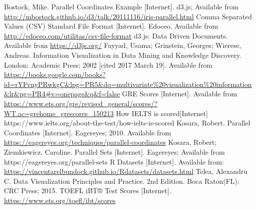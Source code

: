 \documentclass[]{article}
\begin{document}
\begin{thebibliography}{11}
		Bostock, Mike. Parallel Coordinates Example [Internet]. d3.js; Available from \url{http://mbostock.github.io/d3/talk/20111116/iris-parallel.html}
		Comma Separated Values (CSV) Standard File Format [Internet]. Edoceo. Available from \url{http://edoceo.com/utilitas/csv-file-format}
		d3.js: Data Driven Documents. Available from \url{https://d3js.org/}
		Fayyad, Usama; Grinstein, Georges; Wierese, Andreas. Information Visualization in Data Mining and Knowledge Discovery. London: Academic Press; 2002 [cited 2017 March 19]. Available from \url{https://books.google.com/books?id=rYFvnyPRwkgC&lpg=PR5&dq=multivariate%20visualization%20information&lr&pg=PR4#v=onepage&q&f=false}
		GRE Scores [Internet]. Available from \url{https://www.ets.org/gre/revised_general/scores/?WT.ac=grehome_grescores_150213}
		How IELTS is scored[Internet] https://www.ielts.org/about-the-test/how-ielts-is-scored
		Kosara, Robert. Parallel Coordinates [Internet]. Eagereyes; 2010. Available from \url{https://eagereyes.org/techniques/parallel-coordinates}
		Kosara, Robert; Ziemkiewicz, Caroline. Parallel Sets [Internet]. Eagereyes; Available from https://eagereyes.org/parallel-sets
		R Datasets [Internet]. Available from: \url{https://vincentarelbundock.github.io/Rdatasets/datasets.html}
		Telea, Alexandru C. Data Visualization Principles and Practice. 2nd Edition. Boca Raton(FL): CRC Press; 2015.
		TOEFL iBT® Test Scores [Internet]. \url{https://www.ets.org/toefl/ibt/scores}
\end{thebibliography}
\end{document}
